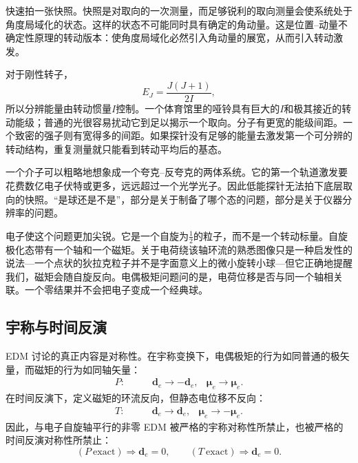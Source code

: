 快速拍一张快照。快照是对取向的一次测量，而足够锐利的取向测量会使系统处于角度局域化的状态。这样的状态不可能同时具有确定的角动量。这是位置--动量不确定性原理的转动版本：使角度局域化必然引入角动量的展宽，从而引入转动激发。

对于刚性转子，
\begin{equation}
E_J=\frac{J(J+1)}{2I},
\end{equation}
所以分辨能量由转动惯量\(I\)控制。一个体育馆里的哑铃具有巨大的\(I\)和极其接近的转动能级；普通的光很容易扰动它到足以揭示一个取向。分子有更宽的能级间距。一个致密的强子则有宽得多的间距。如果探针没有足够的能量去激发第一个可分辨的转动结构，重复测量就只能看到转动平均后的基态。

一个介子可以粗略地想象成一个夸克--反夸克的两体系统。它的第一个轨道激发要花费数亿电子伏特或更多，远远超过一个光学光子。因此低能探针无法拍下底层取向的快照。``是球还是不是''，部分是关于制备了哪个态的问题，部分是关于仪器分辨率的问题。

电子使这个问题更加尖锐。它是一个自旋为\(\tfrac12\)的粒子，而不是一个转动标量。自旋极化态带有一个轴和一个磁矩。关于电荷绕该轴环流的熟悉图像只是一种启发性的说法---一个点状的狄拉克粒子并不是字面意义上的微小旋转小球---但它正确地提醒我们，磁矩会随自旋反向。电偶极矩问题问的是，电荷位移是否与同一个轴相关联。一个零结果并不会把电子变成一个经典球。

\begin{classroomqa}
\end{classroomqa}

\begin{classroomqa}
\end{classroomqa}

\subsection{宇称与时间反演}

EDM 讨论的真正内容是对称性。在宇称变换下，电偶极矩的行为如同普通的极矢量，而磁矩的行为如同轴矢量：
\begin{align}
P:\qquad &\mathbf d_e \to -\mathbf d_e,
&\boldsymbol{\mu}_e \to \boldsymbol{\mu}_e .
\end{align}
在时间反演下，定义磁矩的环流反向，但静态电位移不反向：
\begin{align}
T:\qquad &\mathbf d_e \to \mathbf d_e,
&\boldsymbol{\mu}_e \to -\boldsymbol{\mu}_e .
\end{align}
因此，与电子自旋轴平行的非零 EDM 被严格的宇称对称性所禁止，也被严格的时间反演对称性所禁止：
\begin{equation}
(P\ \text{exact}) \Rightarrow \mathbf d_e=0,
\qquad
(T\ \text{exact}) \Rightarrow \mathbf d_e=0.
\end{equation}

